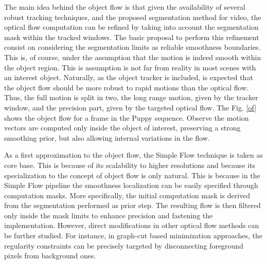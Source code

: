 The main idea behind the object flow is that given the availability of several robust tracking techniques, and the proposed
segmentation method for video, the optical flow computation can be refined by taking into account the segmentation mask within the tracked windows. 
The basic proposal to perform this refinement consist on considering the segmentation limits  as reliable smoothness boundaries. 
This is, of course, under the assumption that the motion is indeed smooth within the object region. 
This is assumption is not far from reality in most scenes with an interest object. 
Naturally, as the object tracker is included, is expected that the object flow should be more robust to rapid motions than the
optical flow. 
Thus, the full motion is split in two, the long range motion, given by the tracker window, and the precision part, given by the targeted optical flow. The Fig. \ref{of} shows 
the object flow for a frame in the Puppy sequence. Observe the motion vectors are computed only inside the object of interest, preserving a strong smoothing prior, but 
also allowing internal variations in the flow. 

As a first approximation to the object flow, the Simple Flow technique \cite{c21} is taken as core base. This is because of its scalability 
to higher resolutions and because its specialization to the concept of object flow is only natural. This is because in the Simple Flow pipeline 
the smoothness localization can be easily specified through computation masks. More specifically, the initial computation mask is derived from 
the segmentation performed as prior step. The resulting flow is then filtered only inside the mask limits to enhance precision and fastening the 
implementation. However, direct modifications in other optical flow methods can be further studied. For instance, in graph-cut based 
minimization approaches, the regularity constraints can be precisely targeted by disconnecting foreground pixels from background ones.

